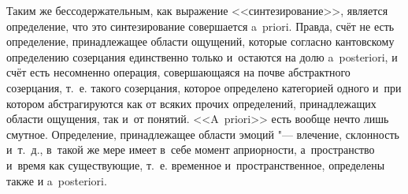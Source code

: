 Таким же бессодержательным, как выражение <<синтезирование>>, является
определение, что это синтезирование совершается a~priori. Правда, счёт не
есть определение, принадлежащее области ощущений, которые согласно кантовскому
определению созерцания единственно только и~остаются на долю a~poste\-riori, и
счёт есть несомненно операция, совершающаяся на почве абстрактного
созерцания, т.~е. такого созерцания, которое определено категорией одного и~при
котором абстрагируются как от всяких прочих определений, принадлежащих области
ощущения, так и~от понятий. <<A~priori>> есть вообще нечто лишь смутное.
Определение, принадлежащее области эмоций "--- влечение, склонность и~т.~д.,
в~такой же мере имеет в~себе момент априорности, а~пространство и~время как
существующие, т.~е. временное и~пространственное, определены также и
a~poste\-ri\-ori.

